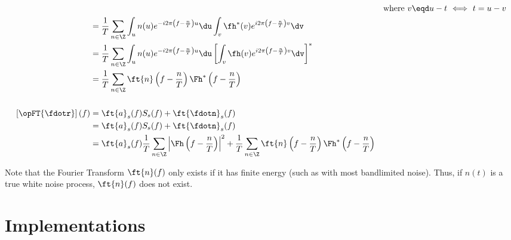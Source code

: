 \begin{align*}
     && \text{where $v\eqd u-t$ $\iff$ $t=u-v$}
   \\&= \frac{1}{T}\sum_{n\in\Z}\int_u n(u) e^{-i2\pi\left(f-\frac{n}{T}\right)u}\du
                         \int_v \fh^\ast(v) e^{i2\pi\left(f-\frac{n}{T}\right)v}\dv
   \\&= \frac{1}{T}\sum_{n\in\Z}\int_u n(u) e^{-i2\pi\left(f-\frac{n}{T}\right)u}\du
                         \left[\int_v \fh(v) e^{i2\pi\left(f-\frac{n}{T}\right)v}\dv\right]^\ast
   \\&= \frac{1}{T}\sum_{n\in\Z} \ft{n}     \left(f-\frac{n}{T}\right)
                          \Fh^\ast\left(f-\frac{n}{T}\right)
\\
\\
   \left[\opFT{\fdotr}\right](f)
     &= \ft{a}_s(f) S_s(f) + \ft{\fdotn}_s(f)
   \\&= \ft{a}_s(f) S_s(f) + \ft{\fdotn}_s(f)
   \\&= \ft{a}_s(f)
        \frac{1}{T} \sum_{n\in\Z} \left|\Fh\left(f-\frac{n}{T}\right)\right|^2
        +\frac{1}{T}\sum_{n\in\Z} \ft{n}     \left(f-\frac{n}{T}\right)
                          \Fh^\ast\left(f-\frac{n}{T}\right)
\end{align*}

Note that the Fourier Transform $\ft{n}(f)$ only exists if it has finite energy
(such as with most bandlimited noise).
Thus, if $n(t)$ is a true white noise process,
$\ft{n}(f)$ does not exist.

\section{Implementations}

